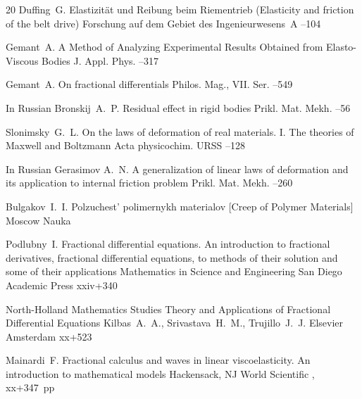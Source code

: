 \begin{thebibliography}{20}
\by Duffing~G.
\paper Elastizit\"at und Reibung beim Riementrieb (Elasticity and friction of the belt drive)
\jour Forschung auf dem Gebiet des Ingenieurwesens~A
--104


\by Gemant~A.
\paper A Method of Analyzing Experimental Results Obtained from Elasto-Viscous Bodies
\jour J. Appl. Phys.
--317

\by Gemant~A.
\paper On fractional differentials
\jour Philos. Mag., VII. Ser.
--549

\lang In Russian
\by Bronskij~A.~P.
\paper Residual effect in rigid bodies
\jour Prikl. Mat. Mekh.
--56


\by Slonimsky~G.~L.
\paper On the laws of deformation of real materials. I. The theories of Maxwell and Boltzmann
\jour Acta physicochim. URSS
--128

\lang In Russian
\by Gerasimov A.~N.
\paper A generalization of linear laws of deformation and its application to internal friction problem
\jour  Prikl. Mat. Mekh.
--260

\by Bulgakov~I.~I.
\book Polzuchest' polimernykh materialov \rm [Creep of Polymer Materials]
\publaddr Moscow
\publ Nauka

\by Podlubny~I.
\book Fractional differential equations. An introduction to fractional derivatives, fractional differential equations, to methods of their solution and some of their applications
\serial Mathematics in Science and Engineering
\publaddr San Diego
\publ Academic Press
\totalpages xxiv+340


\serial North-Holland Mathematics Studies
\book Theory and Applications of Fractional Differential Equations
\by Kilbas~A.~A., Srivastava~H.~M., Trujillo~J.~J.
\publ Elsevier
\publaddr Amsterdam
\totalpages xx+523


\by Mainardi~F.
\book Fractional calculus and waves in linear viscoelasticity. An introduction to mathematical models
\publaddr Hackensack, NJ
\publ World Scientific
,
\totalpages xx+347~pp


\end{thebibliography}
